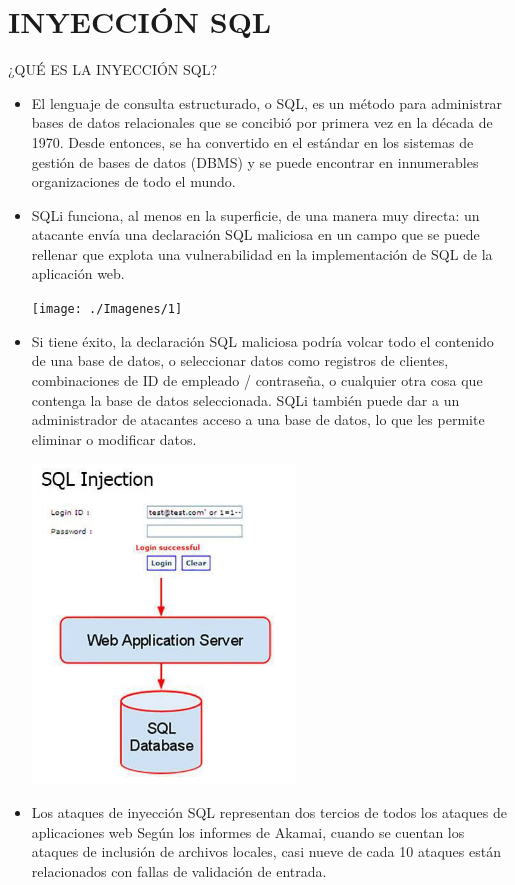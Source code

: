 \documentclass[%
 reprint,
 amsmath,amssymb,
 aps,
]{revtex4-1}
\begin{document}
\section{INYECCIÓN SQL}
¿QUÉ ES LA INYECCIÓN SQL?
\begin{itemize}
\item El lenguaje de consulta estructurado, o SQL, es un método para administrar bases de datos relacionales que se concibió por primera vez en la década de 1970. Desde entonces, se ha convertido en el estándar en los sistemas de gestión de bases de datos (DBMS) y se puede encontrar en innumerables organizaciones de todo el mundo.
\item SQLi funciona, al menos en la superficie, de una manera muy directa: un atacante envía una declaración SQL maliciosa en un campo que se puede rellenar que explota una vulnerabilidad en la implementación de SQL de la aplicación web.
\begin{center}
	\texttt{[image: ./Imagenes/1]}
\end{center}	
\item Si tiene éxito, la declaración SQL maliciosa podría volcar todo el contenido de una base de datos, o seleccionar datos como registros de clientes, combinaciones de ID de empleado / contraseña, o cualquier otra cosa que contenga la base de datos seleccionada. SQLi también puede dar a un administrador de atacantes acceso a una base de datos, lo que les permite eliminar o modificar datos.
\begin{center}
	\includegraphics[width=7cm]{./Imagenes/2}
\end{center}	
	\item Los ataques de inyección SQL representan dos tercios de todos los ataques de aplicaciones web
Según los informes de Akamai, cuando se cuentan los ataques de inclusión de archivos locales, casi nueve de cada 10 ataques están relacionados con fallas de validación de entrada.

\end{itemize}
\end{document}
